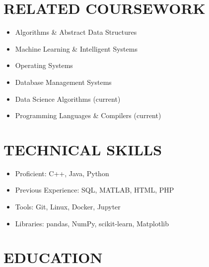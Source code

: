 \documentclass[11pt, a4paper, roman]{moderncv}
\begin{document}
\maketitle
\vspace*{-12mm}

\begin{multicols}{2}
	\section{RELATED COURSEWORK}

	\begin{itemize}
		\item Algorithms \& Abstract Data Structures
		\item Machine Learning \& Intelligent Systems
		\item Operating Systems
		\item Database Management Systems
		\item Data Science Algorithms (current)
		\item Programming Languages \& Compilers (current)
	\end{itemize}
	
	\columnbreak  
	
	\section{TECHNICAL SKILLS}
	
	\begin{itemize}
		\item Proficient: C++, Java, Python
		\item Previous Experience: SQL, MATLAB, HTML, PHP
		\item Tools: Git, Linux, Docker, Jupyter
		\item Libraries: pandas, NumPy, scikit-learn, Matplotlib
	\end{itemize}
\end{multicols}

\section{EDUCATION}
\end{document}
